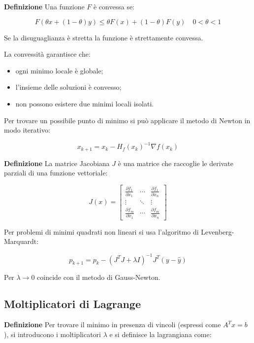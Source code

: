 \documentclass{article}
\newcommand{\df}{\noindent\textbf{Definizione} }
\begin{document}
\df Una funzione $F$ è convessa se:

\[
F(\theta x+(1-\theta)y)
\le
\theta F(x)+(1-\theta)F(y)\quad 0<\theta<1
\]

\vspace{5pt}

Se la disuguaglianza è stretta la funzione è strettamente convessa.\newline

La convessità garantisce che:

\begin{itemize}
    \item ogni minimo locale è globale;
    \item l'insieme delle soluzioni è convesso;
    \item non possono esistere due minimi locali isolati.\newline
\end{itemize}

Per trovare un possibile punto di minimo si può applicare il metodo di Newton in modo iterativo:

\[
x_{k+1}=x_k-H_f(x_k)^{-1}\nabla f(x_k)
\]\newline

\df La matrice Jacobiana $J$ è una matrice che raccoglie le derivate parziali di una funzione vettoriale:

\[
J(x)=
\begin{bmatrix}
\frac{\partial f_1}{\partial x_1} &
\cdots &
\frac{\partial f_1}{\partial x_n} \\
\vdots & \ddots & \vdots \\
\frac{\partial f_m}{\partial x_1} &
\cdots &
\frac{\partial f_m}{\partial x_n}
\end{bmatrix}
\]\newline

Per problemi di minimi quadrati non lineari si usa l'algoritmo di Levenberg-Marquardt:

\[
p_{k+1}=p_k-(J^TJ+\lambda I)^{-1}
J^T(y-\hat y)
\]

\vspace{7pt}

Per $\lambda\rightarrow0$ coincide con il metodo di Gauss-Newton.

\subsection{Moltiplicatori di Lagrange}

\df Per trovare il minimo in presenza di vincoli (espressi come $A^Tx=b$), si introducono i moltiplicatori $\lambda$ e si definisce la lagrangiana come:
\end{document}
